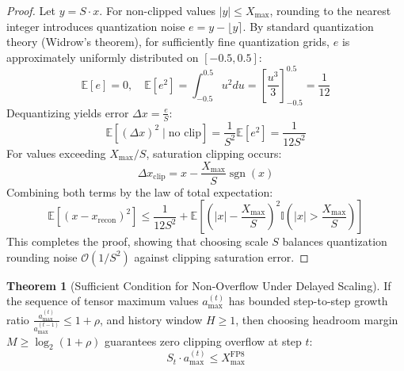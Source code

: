 \documentclass[11pt,a4paper]{article}
\theoremstyle{definition}
\newtheorem{theorem}{\textbf{Theorem}}[section]
\begin{document}
\begin{proof}
Let $y = S \cdot x$. For non-clipped values $|y| \le X_{\max}$, rounding to the nearest integer introduces quantization noise $e = y - \lfloor y \rceil$.
By standard quantization theory (Widrow's theorem), for sufficiently fine quantization grids, $e$ is approximately uniformly distributed on $[-0.5, 0.5]$:
{\boldmath
\begin{equation}
\mathbb{E}[e] = 0, \quad \mathbb{E}[e^2] = \int_{-0.5}^{0.5} u^2 du = \left[ \frac{u^3}{3} \right]_{-0.5}^{0.5} = \frac{1}{12}
\end{equation}
}
Dequantizing yields error $\Delta x = \frac{e}{S}$:
{\boldmath
\begin{equation}
\mathbb{E}[(\Delta x)^2 \mid \text{no clip}] = \frac{1}{S^2} \mathbb{E}[e^2] = \frac{1}{12 S^2}
\end{equation}
}
For values exceeding $X_{\max}/S$, saturation clipping occurs:
{\boldmath
\begin{equation}
\Delta x_{\text{clip}} = x - \frac{X_{\max}}{S} \operatorname{sgn}(x)
\end{equation}
}
Combining both terms by the law of total expectation:
{\boldmath
\begin{equation}
\mathbb{E}\left[ (x - x_{\text{recon}})^2 \right] \le \frac{1}{12 S^2} + \mathbb{E}\left[ \left( |x| - \frac{X_{\max}}{S} \right)^2 \mathbb{I}\left(|x| > \frac{X_{\max}}{S}\right) \right]
\end{equation}
}
This completes the proof, showing that choosing scale $S$ balances quantization rounding noise $\mathcal{O}(1/S^2)$ against clipping saturation error.
\end{proof}

\begin{theorem}[Sufficient Condition for Non-Overflow Under Delayed Scaling]
If the sequence of tensor maximum values $a_{\max}^{(t)}$ has bounded step-to-step growth ratio $\frac{a_{\max}^{(t)}}{a_{\max}^{(t-1)}} \le 1 + \rho$, and history window $H \ge 1$, then choosing headroom margin $M \ge \log_2(1 + \rho)$ guarantees zero clipping overflow at step $t$:
{\boldmath
\begin{equation}
S_t \cdot a_{\max}^{(t)} \le X_{\max}^{\text{FP8}}
\end{equation}
}
\end{theorem}
\end{document}
